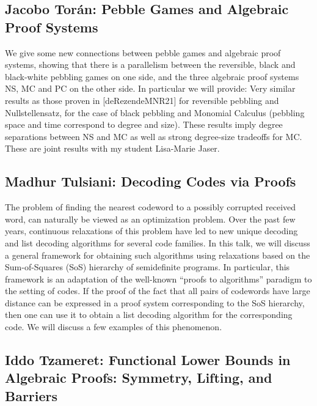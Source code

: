 \documentclass[11pt]{article}
\begin{document}
\subsection*{Jacobo Tor\'{a}n: Pebble Games and Algebraic Proof Systems}\label{Toran}

We give some new connections between pebble games and algebraic proof systems, showing that there is a parallelism between the reversible, black and black-white pebbling games on one side, and the three algebraic proof systems NS, MC and PC on the other side. In particular we will provide: Very similar results as those proven in [deRezendeMNR21] for reversible pebbling and Nullstellensatz, for the case of black pebbling and Monomial Calculus (pebbling space and time correspond to degree and size). These results imply degree separations between NS and MC as well as strong degree-size tradeoffs for MC. These are joint results with my student Lisa-Marie Jaser.


\subsection*{Madhur Tulsiani: Decoding Codes via Proofs}\label{Tulsiani}

The problem of finding the nearest codeword to a possibly corrupted received word, can naturally be viewed as an optimization problem. Over the past few years, continuous relaxations of this problem have led to new unique decoding and list decoding algorithms for several code families. In this talk, we will discuss a general framework for obtaining such algorithms using relaxations based on the Sum-of-Squares (SoS) hierarchy of semidefinite programs. In particular, this framework is an adaptation of the well-known “proofs to algorithms” paradigm to the setting of codes. If the proof of the fact that all pairs of codewords have large distance can be expressed in a proof system corresponding to the SoS hierarchy, then one can use it to obtain a list decoding algorithm for the corresponding code. We will discuss a few examples of this phenomenon.

\subsection*{Iddo Tzameret: Functional Lower Bounds in Algebraic Proofs: Symmetry,
Lifting, and Barriers}\label{Tzameret}
\end{document}
